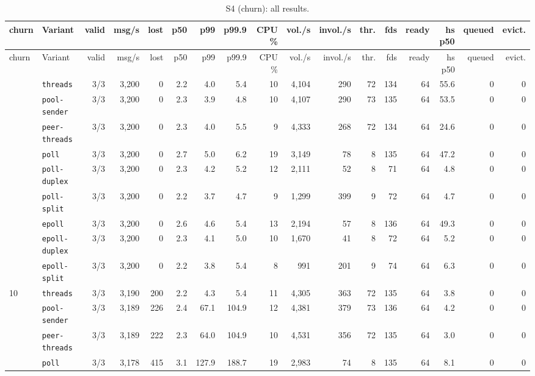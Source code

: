 \begin{longtable}{@{}llrrrrrrrrrrrrrrr@{}}
\caption{S4 (churn): all results.}\label{tab:full-S4}\\
\toprule
churn & Variant & valid & msg/s & lost & p50 & p99 & p99.9 & CPU \% & vol./s & invol./s & thr. & fds & ready & hs p50 & queued & evict. \\
\midrule
\endfirsthead
\toprule
churn & Variant & valid & msg/s & lost & p50 & p99 & p99.9 & CPU \% & vol./s & invol./s & thr. & fds & ready & hs p50 & queued & evict. \\
\midrule
\endhead
\bottomrule
\endfoot
0 & \texttt{threads} & 3/3 & 3{,}200 & 0 & 2.2 & 4.0 & 5.4 & 10 & 4{,}104 & 290 & 72 & 134 & 64 & 55.6 & 0 & 0 \\
 & \texttt{pool-sender} & 3/3 & 3{,}200 & 0 & 2.3 & 3.9 & 4.8 & 10 & 4{,}107 & 290 & 73 & 135 & 64 & 53.5 & 0 & 0 \\
 & \texttt{peer-threads} & 3/3 & 3{,}200 & 0 & 2.3 & 4.0 & 5.5 & 9 & 4{,}333 & 268 & 72 & 134 & 64 & 24.6 & 0 & 0 \\
 & \texttt{poll} & 3/3 & 3{,}200 & 0 & 2.7 & 5.0 & 6.2 & 19 & 3{,}149 & 78 & 8 & 135 & 64 & 47.2 & 0 & 0 \\
 & \texttt{poll-duplex} & 3/3 & 3{,}200 & 0 & 2.3 & 4.2 & 5.2 & 12 & 2{,}111 & 52 & 8 & 71 & 64 & 4.8 & 0 & 0 \\
 & \texttt{poll-split} & 3/3 & 3{,}200 & 0 & 2.2 & 3.7 & 4.7 & 9 & 1{,}299 & 399 & 9 & 72 & 64 & 4.7 & 0 & 0 \\
 & \texttt{epoll} & 3/3 & 3{,}200 & 0 & 2.6 & 4.6 & 5.4 & 13 & 2{,}194 & 57 & 8 & 136 & 64 & 49.3 & 0 & 0 \\
 & \texttt{epoll-duplex} & 3/3 & 3{,}200 & 0 & 2.3 & 4.1 & 5.0 & 10 & 1{,}670 & 41 & 8 & 72 & 64 & 5.2 & 0 & 0 \\
 & \texttt{epoll-split} & 3/3 & 3{,}200 & 0 & 2.2 & 3.8 & 5.4 & 8 & 991 & 201 & 9 & 74 & 64 & 6.3 & 0 & 0 \\
\midrule
10 & \texttt{threads} & 3/3 & 3{,}190 & 200 & 2.2 & 4.3 & 5.4 & 11 & 4{,}305 & 363 & 72 & 135 & 64 & 3.8 & 0 & 0 \\
 & \texttt{pool-sender} & 3/3 & 3{,}189 & 226 & 2.4 & 67.1 & 104.9 & 12 & 4{,}381 & 379 & 73 & 136 & 64 & 4.2 & 0 & 0 \\
 & \texttt{peer-threads} & 3/3 & 3{,}189 & 222 & 2.3 & 64.0 & 104.9 & 10 & 4{,}531 & 356 & 72 & 135 & 64 & 3.0 & 0 & 0 \\
 & \texttt{poll} & 3/3 & 3{,}178 & 415 & 3.1 & 127.9 & 188.7 & 19 & 2{,}983 & 74 & 8 & 135 & 64 & 8.1 & 0 & 0 \\

\end{longtable}

